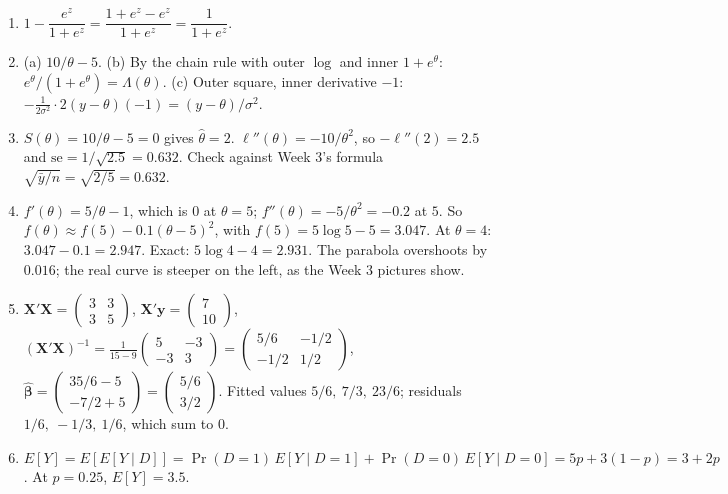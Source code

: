 \documentclass[11pt]{article}
\theoremstyle{definition}
\newcommand{\E}{E}
\newcommand{\loglik}{\ell}
\newcommand{\X}{\bm{X}}
\newcommand{\Y}{\bm{y}}
\newcommand{\bhat}{\hat{\bm{\beta}}}
\begin{document}
\begin{enumerate}[label=\textbf{\arabic*.},leftmargin=2em]
  \item $1 - \dfrac{e^{z}}{1+e^{z}} = \dfrac{1+e^{z} - e^{z}}{1+e^{z}} =
        \dfrac{1}{1+e^{z}}$.

  \item (a) $10/\theta - 5$. (b) By the chain rule with outer $\log$ and
        inner $1 + e^{\theta}$: $e^{\theta}/(1+e^{\theta}) = \Lambda(\theta)$.
        (c) Outer square, inner derivative $-1$:
        $-\frac{1}{2\sigma^2}\cdot 2(y-\theta)(-1) = (y-\theta)/\sigma^2$.

  \item $S(\theta) = 10/\theta - 5 = 0$ gives $\hat\theta = 2$.
        $\loglik''(\theta) = -10/\theta^2$, so $-\loglik''(2) = 2.5$ and
        $\mathrm{se} = 1/\sqrt{2.5} = 0.632$. Check against Week 3's
        formula $\sqrt{\bar y/n} = \sqrt{2/5} = 0.632$.

  \item $f'(\theta) = 5/\theta - 1$, which is $0$ at $\theta = 5$;
        $f''(\theta) = -5/\theta^2 = -0.2$ at $5$. So
        $f(\theta) \approx f(5) - 0.1(\theta-5)^2$, with $f(5) = 5\log 5 - 5
        = 3.047$. At $\theta = 4$: $3.047 - 0.1 = 2.947$. Exact:
        $5\log 4 - 4 = 2.931$. The parabola overshoots by $0.016$; the
        real curve is steeper on the left, as the Week 3 pictures show.

  \item $\X'\X = \begin{pmatrix} 3 & 3 \\ 3 & 5 \end{pmatrix}$,
        $\X'\Y = \begin{pmatrix} 7 \\ 10 \end{pmatrix}$,
        $(\X'\X)^{-1} = \frac{1}{15 - 9}\begin{pmatrix} 5 & -3 \\ -3 & 3 \end{pmatrix}
        = \begin{pmatrix} 5/6 & -1/2 \\ -1/2 & 1/2 \end{pmatrix}$,
        $\bhat = \begin{pmatrix} 35/6 - 5 \\ -7/2 + 5 \end{pmatrix}
        = \begin{pmatrix} 5/6 \\ 3/2 \end{pmatrix}$.
        Fitted values $5/6,\ 7/3,\ 23/6$; residuals $1/6,\ -1/3,\ 1/6$,
        which sum to $0$.

  \item $\E[Y] = \E[\E[Y \mid D]] = \Pr(D = 1)\,\E[Y \mid D = 1] +
        \Pr(D = 0)\,\E[Y \mid D = 0] = 5p + 3(1-p) = 3 + 2p$. At
        $p = 0.25$, $\E[Y] = 3.5$.
\end{enumerate}
\end{document}
